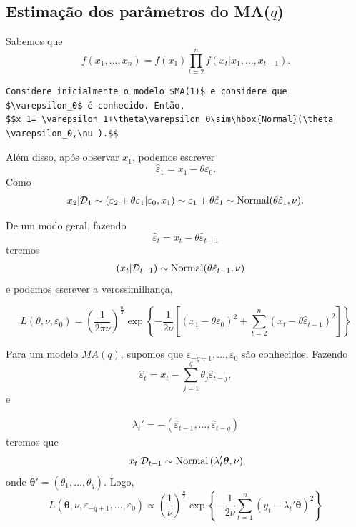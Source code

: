 \documentclass[
  letterpaper,
  DIV=11,
  numbers=noendperiod]{scrartcl}
\theoremstyle{definition}
\theoremstyle{definition}
\theoremstyle{plain}
\theoremstyle{plain}
\theoremstyle{remark}
\begin{document}
\subsection{\texorpdfstring{Estimação dos parâmetros do
MA(\(q\))}{Estimação dos parâmetros do MA(q)}}\label{estimauxe7uxe3o-dos-paruxe2metros-do-maq}

Sabemos que
\[f(x_1,\ldots,x_n)=f(x_1)\prod_{t=2}^{n}f(x_t|x_1,\ldots,x_{t-1}).\]

\begin{verbatim}
Considere inicialmente o modelo $MA(1)$ e considere que $\varepsilon_0$ é conhecido. Então,
$$x_1= \varepsilon_1+\theta\varepsilon_0\sim\hbox{Normal}(\theta \varepsilon_0,\nu ).$$
\end{verbatim}

Além disso, após observar \(x_1\), podemos escrever
\[\hat{\varepsilon}_1=x_1-\theta\varepsilon_0.\] Como \begin{align*}
x_2|\mathcal{D}_1\sim
    (\varepsilon_2+\theta\varepsilon_1|\varepsilon_0,x_1)\sim\varepsilon_1+\theta\hat{\varepsilon}_1\sim\hbox{Normal}(\theta\hat{\varepsilon}_1,\nu).
    \end{align*}

De um modo geral, fazendo
\[\hat{\varepsilon}_t = x_t-\theta\hat{\varepsilon}_{t-1}\] teremos
\begin{align*}
    (x_t|\mathcal{D}_{t-1})&\sim  \hbox{Normal}(\theta \hat{\varepsilon}_{t-1},\nu)
    \end{align*} e podemos escrever a verossimilhança,

\[L(\theta,\nu,\varepsilon_0)=\left(\frac{1}{2\pi\nu}\right)^{\frac{n}{2}}\exp\left\{-\frac{1}{2\nu}\left[(x_1-\theta\varepsilon_0)^2+\sum_{t=2}^n(x_t-\theta\hat{\varepsilon}_{t-1})^2\right]\right\}\]

Para um modelo \(MA(q)\), supomos que
\(\varepsilon_{-q+1},\ldots,\varepsilon_{0}\) são conhecidos. Fazendo
\begin{equation}
    \hat{\varepsilon}_{t}=x_t - \sum_{j=1}^{q}\theta_j\hat{\varepsilon}_{t-j},
    \end{equation} e

\begin{align}
    \lambda_t'=-(\hat{\varepsilon}_{t-1},\ldots,\hat{\varepsilon}_{t-q})
    \end{align} teremos que
\[x_{t}|\mathcal{D}_{t-1}\sim\hbox{Normal}\left(\lambda_t'\boldsymbol{\theta},\nu\right)\]
onde \(\boldsymbol{\theta}'=(\theta_1,\ldots,\theta_q)\). Logo,
\begin{equation}
    L(\boldsymbol{\theta},\nu,\varepsilon_{-q+1},\ldots,\varepsilon_0)\propto \left(\frac{1}{\nu}\right)^{\frac{n}{2}}\exp\left\{-\frac{1}{2\nu}\sum_{t=1}^n\left(y_t -\lambda_t'\boldsymbol{\theta}\right) ^ 2\right\}
    \end{equation}
\end{document}
